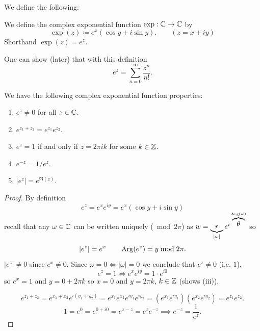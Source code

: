 \documentclass[10pt, a4paper]{article}
\begin{document}
We define the following:
\begin{definition}
    We define the complex exponential function $\exp : \mathbb{C} \to \mathbb{C}$ by
    \[
    \exp(z) \coloneqq e ^ x(\cos{y} + i\sin{y}).\qquad (z = x + iy)
    \]
    Shorthand $\exp(z) = e ^ z$.
\end{definition}

One can show
(later)
that with this definition
\[
e ^ z = \sum_{n = 0}^{\infty}\frac{z ^ n}{n!}.
\]

\begin{proposition}
    We have the following complex exponential function properties:
    
    \begin{enumerate}[label = (\roman*)]
        \item $e ^ z \neq 0$ for all $z \in \mathbb{C}$.

        \item $e ^ {z_1 + z_2} = e ^ {z_1}e ^ {z_2}$.

        \item $e ^ z = 1$ if and only if $z = 2\pi ik$ for some $k \in \mathbb{Z}$.

        \item $e ^ {-z} = 1 / e ^ z$.

        \item $|e ^ z| = e ^ {\Re(z)}$.
    \end{enumerate}

    \begin{proof}
        By definition
        \[
        e ^ z = e ^ {x}e ^ {iy} = e ^ x(\cos{y} + i\sin{y})
        \]
        recall that any $\omega \in \mathbb{C}$ can be written uniquely 
        ($\bmod{2\pi}$)
        as $w = \underbrace{r}_{|\omega|}e ^ {i\overbrace{\theta}^{\operatorname{Arg}(w)}}$ so
        \[
        |e ^ z| = e ^ x\qquad \operatorname{Arg}(e ^ z) = y\bmod{2\pi}.
        \]
        $|e ^ z| \neq 0$ since $e ^ x \neq 0$.
        Since $\omega = 0 \iff |\omega| = 0$ we conclude that $e ^ z \neq 0$
        (i.e. $1$).
        \[
        e ^ z = 1 \iff e ^ xe ^ {iy} = 1 \cdot e ^ {i0}
        \]
        so $e ^ x = 1$ and $y = 0 + 2\pi k$ so $x = 0$ and $y = 2\pi k$,
        $k \in \mathbb{Z}$
        (shows (iii)).

        \[
        e ^ {z_1 + z_2} = e ^ {x_1 + x_2}e ^ {i(y_1 + y_2)} = e ^ {x_1}e ^ {x_2}e ^ {iy_1}e ^ {iy_2} = \left(e ^ {x_1}e ^ {iy_1}\right)\left(e ^ {x_2}e ^ {iy_2}\right) = e ^ {z_1}e ^ {z_2}.
        \]
        \[
        1 = e ^ 0 = e ^ {0 + i0} = e ^ {z - z} =  e ^ ze ^ {-z} \implies e ^ {-z} = \frac{1}{e ^ z}.
        \]
    \end{proof}
\end{proposition}
\end{document}
